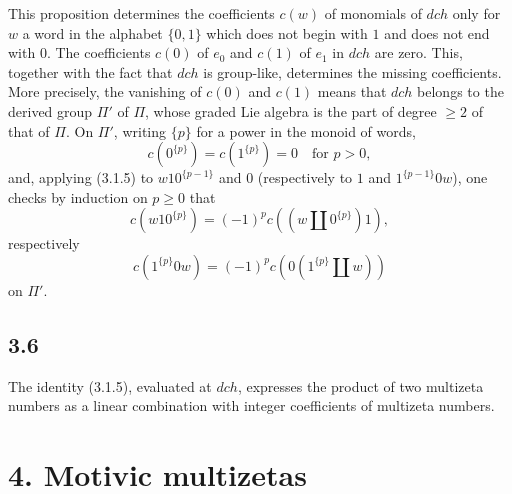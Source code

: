 \documentclass[11pt]{article}
\newcommand{\shuffle}{\mathbin{\amalg}}
\begin{document}
This proposition determines the coefficients $c(w)$ of monomials of $dch$ only for $w$ a word in the alphabet $\{0,1\}$ which does not begin with $1$ and does not end with $0$.
The coefficients $c(0)$ of $e_0$ and $c(1)$ of $e_1$ in $dch$ are zero.
This, together with the fact that $dch$ is group-like, determines the missing coefficients.
More precisely, the vanishing of $c(0)$ and $c(1)$ means that $dch$ belongs to the derived group $\Pi'$ of $\Pi$, whose graded Lie algebra is the part of degree $\geq2$ of that of $\Pi$.
On $\Pi'$, writing $\{p\}$ for a power in the monoid of words,
\begin{equation}
 c(0^{\{p\}})=c(1^{\{p\}})=0\quad\text{for }p>0,
\tag{3.5.1}
\end{equation}
and, applying (3.1.5) to $w10^{\{p-1\}}$ and $0$ (respectively to $1$ and $1^{\{p-1\}}0w$), one checks by induction on $p\geq0$ that
\begin{equation}
 c(w10^{\{p\}})=(-1)^p c((w\shuffle 0^{\{p\}})1),
\tag{3.5.2}
\end{equation}
respectively
\[
 c(1^{\{p\}}0w)=(-1)^p c(0(1^{\{p\}}\shuffle w))
\]
on $\Pi'$.

\subsection*{3.6}
The identity (3.1.5), evaluated at $dch$, expresses the product of two multizeta numbers as a linear combination with integer coefficients of multizeta numbers.

\section*{4. Motivic multizetas}
\end{document}
